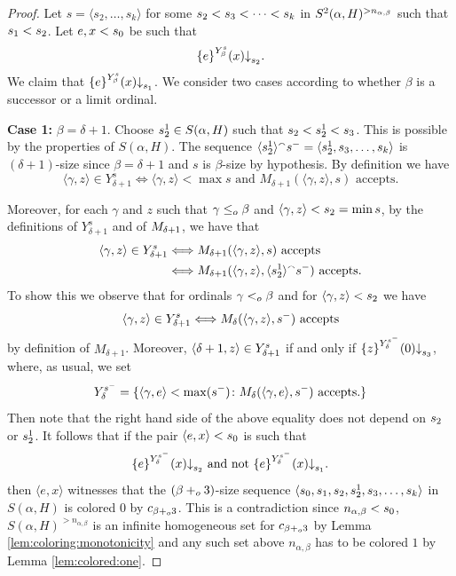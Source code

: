 \documentclass[11pt]{amsart}
\theoremstyle{definition}
\theoremstyle{remark}
\theoremstyle{plain}
\def\la{\langle}
\def\ra{\rangle}
\def\a{\alpha}
\def\b{\beta}
\def\conc{{}^\smallfrown}
\newcommand{\set}[1]{{\{{#1}\}}}
\def\stops{{\downarrow}}
\newcommand{\leo}{<\sb{o}}
\newcommand{\leqo}{\leq\sb{o}}
\newcommand{\pluso}{+\sb{o}}
\def\stops{{\downarrow}}
\def\ifff{\Longleftrightarrow}
\begin{document}
\begin{proof}
Let $s = \langle s_2,\dots, s_k\rangle$ for some 
$s\sb2 < s\sb3 < \dots < s\sb k$ in $S\sp2(\alpha,H)\sp{>n_{\a,\b}}$ such that $s\sb1 < s\sb2$.
Let $e,x<s\sb0$ be such that 
$$
\set{e}\sp {Y\sb\beta \sp s}(x)\stops\sb {s\sb 2}.
$$
We claim that $\set{e}\sp {Y\sb\beta \sp s}(x)\stops\sb {s_1}$.
We consider two cases according to whether $\beta$ is a successor or a limit ordinal. 

\smallskip

\textbf{Case 1:} $\beta=\delta+1$. 
Choose $s\sp 1\sb 2\in S(\alpha,H)$ such that $s\sb 2< s\sp 1\sb 2<s\sb 3$. 
This is possible by the properties of $S(\alpha, H)$. 
The sequence $\langle s\sp 1 \sb 2\rangle \conc s^- = \langle s\sp 1 \sb 2, s\sb 3,\dots, s\sb k\rangle$ is $(\delta+1)$-size since $\beta=\delta+1$ and $s$ is $\beta$-size by hypothesis. By definition we have
$$ \langle\gamma, z\rangle \in Y^s_{\delta+1} \Longleftrightarrow \langle\gamma,z\rangle < \max s \mbox{ and } M_{\delta+1}(\langle \gamma, z\rangle, s) \mbox{ accepts}.$$

Moreover, for each $\gamma$ and $z$ such that $\gamma\leqo\beta$ and $\la\gamma,z\ra<s\sb 2 = \min s$, by the definitions of $Y^s_{\delta+1}$ and of $M\sb{\delta+1}$, we have that
\begin{align*}
\langle \gamma,z\rangle\in Y\sb{\delta+1} \sp s &\ifff M\sb{\delta+1}(\langle \gamma,z\rangle, s)\mbox{ accepts}\\
&\ifff  M\sb{\delta+1}(\langle \gamma,z\rangle, \langle s\sp 1\sb 2 \rangle \conc s^-)\mbox{ accepts.}
\end{align*}
To show this we observe that for ordinals $\gamma\leo \beta$ and for $\langle \gamma,z \rangle<s\sb 2$ we have 
$$
\langle \gamma,z\rangle\in Y\sb{\delta+1} \sp s \ifff M\sb{\delta}(\langle \gamma,z\rangle, s^-)\mbox{ accepts}
$$
by definition of $M_{\delta+1}$. Moreover, $\langle \delta+1,z\rangle\in Y\sb{\delta+1} \sp s$ if and only if $\set{z}\sp{Y\sb{\delta} \sp{s^-} }(0)\stops\sb{s\sb3}$, where, as usual, we set
$$
{Y\sb{\delta}\sp{s^-}}=\set{\langle \gamma,e\rangle < \max(s^-)\colon M\sb{\delta}(\langle \gamma,e\rangle,s^-)\mbox{ accepts.}}
$$ 
Then note that the right hand side of the above equality does not depend on $s\sb 2$ or $s\sp 1\sb2$.
It follows that if the pair $\langle e,x\rangle<s\sb0$ is such that 
$$
\set{e}\sp {Y\sb{\delta}\sp{s^-}}(x)\stops\sb {s\sb 2}\mbox{ and not }
\set{e}\sp {Y\sb{\delta}\sp{s^-}}(x)\stops\sb {s\sb 1}.
$$
then $\langle e,x\rangle$ witnesses that the $(\beta \pluso 3)$-size sequence $\langle s\sb0,s\sb 1,s\sb 2, s\sp 1\sb 2,s\sb 3,\dots,s\sb k\rangle$ in $S(\alpha,H)$ is colored $0$ by $c\sb{\beta \pluso 3}$. 
This is a contradiction since $n_{\a,\b}<s\sb0$, $S(\alpha,H)^{>n_{\a,\b}}$ is an infinite homogeneous set for $c\sb{\beta\pluso3}$ by Lemma \ref{lem:coloring:monotonicity} and any such set above $n_{\a,\b}$ has to be colored $1$ by Lemma \ref{lem:colored:one}.


\end{proof}
\end{document}
